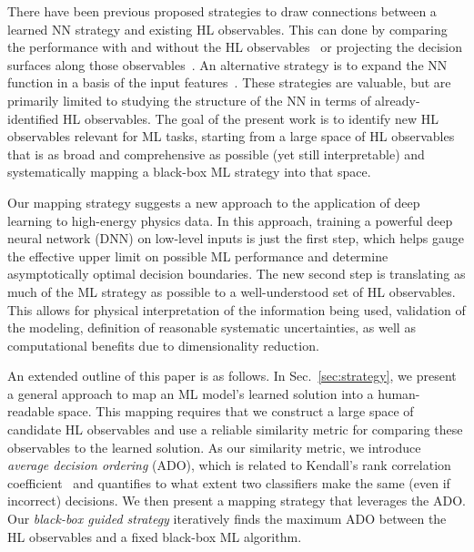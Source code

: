 \documentclass[aps,prd,twocolumn,superscriptaddress,preprintnumbers,nofootinbib,longbibliography,floatfix]{revtex4-1}
\newcommand{\Sec}[1]{Sec.~\ref{#1}}
\begin{document}
There have been previous proposed strategies to draw connections between a learned NN strategy and existing HL observables. This can done by comparing the performance with and without the HL observables~\cite{Chang:2017kvc} or projecting the decision surfaces along those observables~\cite{Baldi:2014kfa}. An alternative strategy is to expand the NN function in a basis of the input features~\cite{2016arXiv161200410A,Wunsch:2018oxb,Roxlo:2018adx}. These strategies are valuable, but are primarily limited to studying the structure of the NN in terms of already-identified  HL observables. The goal of the present work is to identify new HL observables relevant for ML tasks, starting from a large space of HL observables that is as broad and comprehensive as possible (yet still interpretable) and systematically mapping a black-box ML strategy into that space.

Our mapping strategy suggests a new approach to the application of deep learning to high-energy physics data. In this approach, training a powerful deep neural network (DNN) on low-level inputs is just the first step, which helps gauge the effective upper limit on possible ML performance and determine asymptotically optimal decision boundaries. The new second step is translating as much of the ML strategy as possible to a well-understood set of HL observables. This allows for physical interpretation of the information being used, validation of the modeling, definition of reasonable systematic uncertainties, as well as computational benefits due to dimensionality reduction.

An extended outline of this paper is as follows. In \Sec{sec:strategy}, we present a general approach to map an ML model's learned solution into a human-readable space. This mapping requires that we construct a large space of candidate HL observables and use a reliable similarity metric for comparing these observables to the learned solution. As our similarity metric, we introduce \emph{average decision ordering} (ADO), which is related to Kendall's rank correlation coefficient~\cite{ktau} and quantifies to what extent two classifiers make the same (even if incorrect) decisions. We then present a mapping strategy that leverages the ADO. Our \emph{black-box guided strategy} iteratively finds the maximum ADO between the HL observables and a fixed black-box ML algorithm.
\end{document}
